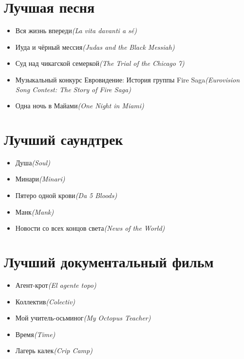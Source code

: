 \documentclass[a4paper,10pt]{article}
\begin{document}
\begin{multicols}{2}
\section{Лучшая песня}

\begin{itemize}
	\item Вся жизнь впереди\newline\textit{(La vita davanti a sé)}
	\item Иуда и чёрный мессия\newline\textit{(Judas and the Black Messiah)}
	\item Суд над чикагской семеркой\newline\textit{(The Trial of the Chicago 7)}
	\item Музыкальный конкурс Евровидение: История группы Fire Saga\newline\textit{(Eurovision Song Contest: The Story of Fire Saga)}
	\item Одна ночь в Майами\newline\textit{(One Night in Miami)}
\end{itemize}

\section{Лучший саундтрек}

\begin{itemize}
	\item Душа\newline\textit{(Soul)}
	\item Минари\newline\textit{(Minari)}
	\item Пятеро одной крови\newline\textit{(Da 5 Bloods)}
	\item Манк\newline\textit{(Mank)}
	\item Новости со всех концов света\newline\textit{(News of the World)}
\end{itemize}

\section{Лучший документальный фильм}

\begin{itemize}
	\item Агент-крот\newline\textit{(El agente topo)}
	\item Коллектив\newline\textit{(Colectiv)}
	\item Мой учитель-осьминог\newline\textit{(My Octopus Teacher)}
	\item Время\newline\textit{(Time)}
	\item Лагерь калек\newline\textit{(Crip Camp)}
\end{itemize}


\end{multicols}
\end{document}
